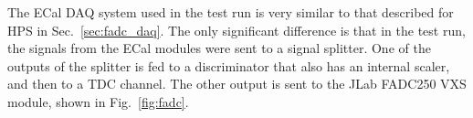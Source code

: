 The ECal DAQ system used in the test run is very similar to that described for HPS in Sec.~\ref{sec:fadc_daq}. 
The only significant difference is that in the test run, the signals from the ECal modules were sent to a signal splitter. One of the outputs of the splitter is fed to a 
discriminator that also has an internal scaler, and then to a TDC channel. The other output is sent to the 
JLab FADC250 VXS module, shown in Fig.~\ref{fig:fadc}.

